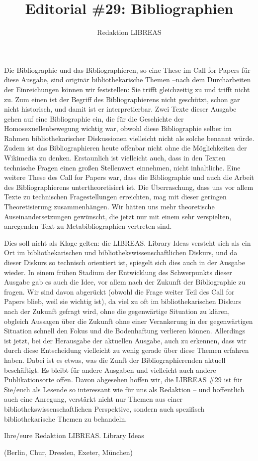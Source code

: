 \documentclass[a4paper,
fontsize=11pt,
oneside,
numbers=noperiodatend,
parskip=half-,
bibliography=totoc,
final
]{scrartcl}
\title{\LARGE{Editorial \#29: Bibliographien}} %
\author{Redaktion LIBREAS} %
\date{}
\begin{document}
\maketitle
\thispagestyle{fancyplain} 


Die Bibliographie und das Bibliographieren, so eine These im Call for
Papers für diese Ausgabe, sind originär bibliothekarische Themen --nach
dem Durcharbeiten der Einreichungen können wir feststellen: Sie trifft
gleichzeitig zu und trifft nicht zu. Zum einen ist der Begriff des
Bibliographierens nicht geschützt, schon gar nicht historisch, und damit
ist er interpretierbar. Zwei Texte dieser Ausgabe gehen auf eine
Bibliographie ein, die für die Geschichte der Homosexuellenbewegung
wichtig war, obwohl diese Bibliographie selber im Rahmen
bibliothekarischer Diskussionen vielleicht nicht als solche benannt
würde. Zudem ist das Bibliographieren heute offenbar nicht ohne die
Möglichkeiten der Wikimedia zu denken. Erstaunlich ist vielleicht auch,
dass in den Texten technische Fragen einen großen Stellenwert einnehmen,
nicht inhaltliche. Eine weitere These des Call for Papers war, dass die
Bibliographie und auch die Arbeit des Bibliographierens
untertheoretisiert ist. Die Überraschung, dass uns vor allem Texte zu
technischen Fragestellungen erreichten, mag mit dieser geringen
Theoretisierung zusammenhängen. Wir hätten uns mehr theoretische
Auseinandersetzungen gewünscht, die jetzt nur mit einem sehr
verspielten, anregenden Text zu Metabibliographien vertreten sind.

Dies soll nicht als Klage gelten: die LIBREAS. Library Ideas versteht
sich als ein Ort im bibliothekarischen und bibliothekswissenschaftlichen
Diskurs, und da dieser Diskurs so technisch orientiert ist, spiegelt
sich dies auch in der Ausgabe wieder. In einem frühen Stadium der
Entwicklung des Schwerpunkts dieser Ausgabe gab es auch die Idee, vor
allem nach der Zukunft der Bibliographie zu fragen. Wir sind davon
abgerückt (obwohl die Frage weiter Teil des Call for Papers blieb, weil
sie wichtig ist), da viel zu oft im bibliothekarischen Diskurs nach der
Zukunft gefragt wird, ohne die gegenwärtige Situation zu klären,
obgleich Aussagen über die Zukunft ohne einer Verankerung in der
gegenwärtigen Situation schnell den Fokus und die Bodenhaftung verlieren
können. Allerdings ist jetzt, bei der Herausgabe der aktuellen Ausgabe,
auch zu erkennen, dass wir durch diese Entscheidung vielleicht zu wenig
gerade über diese Themen erfahren haben. Dabei ist es etwas, was die
Zunft der Bibliographierenden aktuell beschäftigt. Es bleibt für andere
Ausgaben und vielleicht auch andere Publikationsorte offen. Davon
abgesehen hoffen wir, die LIBREAS \#29 ist für Sie/euch als Lesende so
interessant wie für uns als Redaktion -- und hoffentlich auch eine
Anregung, verstärkt nicht nur Themen aus einer
bibliothekswissenschaftlichen Perspektive, sondern auch spezifisch
bibliothekarische Themen zu behandeln.

Ihre/eure Redaktion LIBREAS. Library Ideas

(Berlin, Chur, Dresden, Exeter, München)

\end{document}
